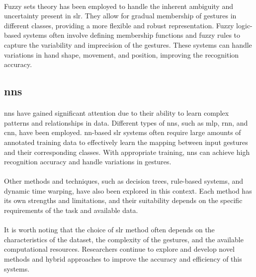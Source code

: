 \paragraph{}
Fuzzy sets theory has been employed to handle the inherent ambiguity and uncertainty present in \ac{slr}. They allow for gradual membership of gestures in different classes, providing a more flexible and robust representation. Fuzzy logic-based systems often involve defining membership functions and fuzzy rules to capture the variability and imprecision of the gestures. These systems can handle variations in hand shape, movement, and position, improving the recognition accuracy.

\subsection{\ac{nn}s}
\paragraph{}
\ac{nn}s have gained significant attention due to their ability to learn complex patterns and relationships in data. Different types of \ac{nn}s, such as \ac{mlp}, \ac{rnn}, and \ac{cnn}, have been employed. \ac{nn}-based \ac{slr} systems often require large amounts of annotated training data to effectively learn the mapping between input gestures and their corresponding classes. With appropriate training, \ac{nn}s can achieve high recognition accuracy and handle variations in gestures.

\paragraph{}
Other methods and techniques, such as decision trees, rule-based systems, and dynamic time warping, have also been explored in this context. Each method has its own strengths and limitations, and their suitability depends on the specific requirements of the task and available data.
\paragraph{}
It is worth noting that the choice of \ac{slr} method often depends on the characteristics of the dataset, the complexity of the gestures, and the available computational resources. Researchers continue to explore and develop novel methods and hybrid approaches to improve the accuracy and efficiency of this systems.
